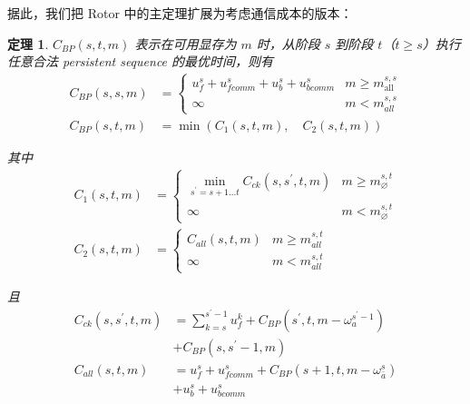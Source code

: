 \documentclass[10pt,letterpaper,twocolumn]{article}
\newtheorem{theorem}{定理}
\begin{document}
据此，我们把 Rotor 中的主定理扩展为考虑通信成本的版本：

\begin{theorem}
    $C_{BP} (s, t, m)$ 表示在可用显存为 $m$ 时，从阶段 $s$ 到阶段 $t$（$t \geq s$）执行任意合法 persistent sequence 的最优时间，则有
    \begin{equation}
        \begin{aligned}
            C_{BP}(s, s, m) & = \begin{cases}u_f^s + u_{fcomm}^s + u_b^s + u_{bcomm}^s & m \geq m_{\text {all }}^{s, s} \\
            \infty & m<m_{a l l}^{s, s}\end{cases} \\
            C_{BP}(s, t, m) & =\min \left(C_1(s, t, m), \quad C_2(s, t, m)\right)
        \end{aligned}
    \end{equation}
    
    其中
    \begin{equation}
        \begin{aligned}
            C_1(s, t, m) & = \begin{cases}\min _{s^{\prime}=s+1 \ldots t} C_{ck}\left(s, s^{\prime}, t, m\right) & m \geq m_{\varnothing}^{s, t} \\
            \infty & m<m_{\varnothing}^{s, t}\end{cases} \\
            C_2(s, t, m) & =\begin{cases}
            C_{all}(s, t, m) & m \geq m_{all}^{s, t} \\
            \infty & m<m_{all}^{s, t}
            \end{cases}
        \end{aligned}
    \end{equation}

    且
    \begin{equation}
        \begin{aligned}
            C_{ck}\left(s, s^{\prime}, t, m\right) & =\sum_{k=s}^{s^{\prime}-1} u_f^k+C_{B P}\left(s^{\prime}, t, m-\omega_a^{s^{\prime}-1}\right) \\
            & + C_{B P}\left(s, s^{\prime}-1, m\right) \\
            C_{all}(s, t, m) & =u_f^s + u_{fcomm}^s + C_{B P}\left(s+1, t, m-\omega_{\bar{a}}^s\right) \\
            & + u_b^s + u_{bcomm}^s
        \end{aligned}
    \end{equation}


\end{theorem}
\end{document}
